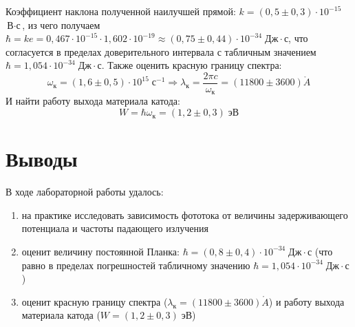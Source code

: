 \documentclass[a4paper,12pt]{extarticle}
\begin{document}
Коэффициент наклона полученной наилучшей прямой: $k = (0,5 \pm 0,3) \cdot 10^{-15}$ $\text{В} \cdot \text{с}$, из чего получаем $\hbar = ke =  0,467\cdot 10^{-15} \cdot 1,602 \cdot 10^{-19} \approx (0,75 \pm 0,44) \cdot 10^{-34} \; \text{Дж} \cdot \text{с}$, что согласуется в пределах доверительного интервала с табличным значением $ \hbar = 1,054 \cdot 10^{-34} \; \text{Дж} \cdot \text{с}$.
Также оценить красную границу спектра: 
\begin{equation}
	\omega_{\text{к}} = (1,6 \pm 0,5) \cdot 10^{15} \; с^{-1} \Rightarrow \lambda_{\text{к}} = \dfrac{2\pi c}{\omega_{\text{к}}} = (11800 \pm 3600) \mathring{A}
\end{equation}
И найти работу выхода материала катода:
\begin{equation}
	W = \hbar \omega_{\text{к}} = (1,2 \pm 0,3) \; \text{эВ}
\end{equation}
\section*{Выводы}
В ходе лабораторной работы удалось:
\begin{enumerate}
    \item на практике исследовать зависимость фототока от величины задерживающего потенциала и частоты падающего излучения
    \item оценит величину постоянной Планка: $\hbar = (0,8 \pm 0,4) \cdot 10^{-34} \; \text{Дж} \cdot \text{с}$ (что равно в пределах погрешностей табличному значению $ \hbar = 1,054 \cdot 10^{-34} \; \text{Дж} \cdot \text{с}$)
    \item оценит красную границу спектра ($\lambda_{\text{к}} = (11800 \pm 3600) \mathring{A}$) и работу выхода материала катода ($W = (1,2 \pm 0,3) \; \text{эВ}$)
\end{enumerate}
\end{document}
